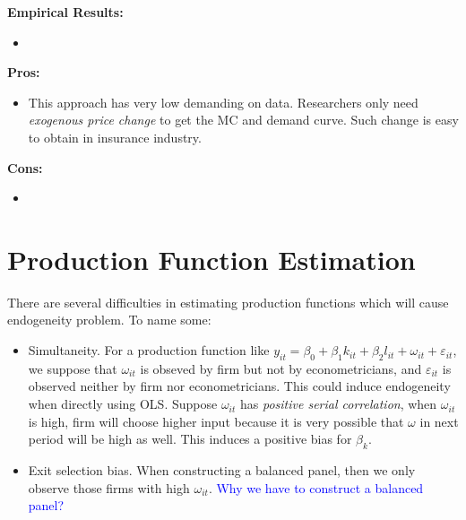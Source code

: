 \documentclass{book}
\theoremstyle{plain}
\theoremstyle{definition}
\begin{document}
\vspace{1em}
\noindent
\textbf{Empirical Results:}
\begin{itemize}
	\item 
\end{itemize}

\vspace{1em}
\noindent
\textbf{Pros:}
\begin{itemize}
	\item This approach has very low demanding on data. Researchers only need \textit{exogenous price change} to get the MC and demand curve. Such change is easy to obtain in insurance industry.
\end{itemize}

\vspace{1em}
\noindent
\textbf{Cons:}
\begin{itemize}
	\item 
\end{itemize}








\chapter{Production Function Estimation} %
\label{cha:production_function_estimation}

There are several difficulties in estimating production functions which will cause endogeneity problem. To name some:
\begin{itemize}
	\item Simultaneity. For a production function like $y_{it}=\beta_0+\beta_1 k_{it}+\beta_2 l_{it} + \omega_{it}+\varepsilon_{it}$, we suppose that $\omega_{it}$ is obseved by firm but not by econometricians, and $\varepsilon_{it}$ is observed neither by firm nor econometricians. This could induce endogeneity when directly using OLS. 
	Suppose $\omega_{it}$ has \textit{positive serial correlation}, when $\omega_{it}$ is high, firm will choose higher input because it is very possible that $\omega$ in next period will be high as well. This induces a positive bias for $\beta_k$.
	\item Exit selection bias. When constructing a balanced panel, then we only observe those firms with high $\omega_{it}$.
	\textcolor{blue}{Why we have to construct a balanced panel?}
\end{itemize}
\end{document}
